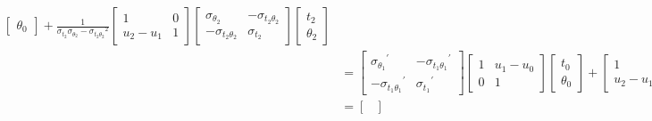 \documentclass[a4paper,landscape]{article}
\begin{document}
\begin{align*}
\begin{bmatrix}
                \theta_0
            \end{bmatrix}
            +
            \tfrac{1}{\sigma_{t_2}\sigma_{\theta_2}-{\sigma_{t_2\theta_2}}^2}
            \begin{bmatrix}
                1 & 0\\
                u_2-u_1 & 1
            \end{bmatrix}
            \begin{bmatrix}
                \sigma_{\theta_2} & -\sigma_{t_2\theta_2}\\
                -\sigma_{t_2\theta_2} & \sigma_{t_2}
            \end{bmatrix}
            \begin{bmatrix}
                t_2\\
                \theta_2
            \end{bmatrix}
            \\
            &=
            \begin{bmatrix}
                {\sigma_{\theta_1}}^{'} & -{\sigma_{t_1\theta_1}}^{'}\\
                -{\sigma_{t_1\theta_1}}^{'} & {\sigma_{t_1}}^{'}
            \end{bmatrix}
            \begin{bmatrix}
                1 & u_1-u_0\\
                0 & 1
            \end{bmatrix}
            \begin{bmatrix}
                t_0\\
                \theta_0
            \end{bmatrix}
            +
            \begin{bmatrix}
                1 & 0\\
                u_2-u_1 & 1
            \end{bmatrix}
            \begin{bmatrix}
                  {\sigma_{\theta_2}}^{'} & -{\sigma_{t_2\theta_2}}^{'}\\
                -{\sigma_{t_2\theta_2}}^{'} & {\sigma_{t_2}}^{'}
            \end{bmatrix}
            \begin{bmatrix}
                t_2\\
                \theta_2
            \end{bmatrix}
            \\
            &=
            \begin{bmatrix}

\end{bmatrix}
\end{align*}
\end{document}
